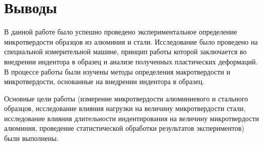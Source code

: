 \documentclass[12pt, a4paper]{article}
\begin{document}
    \newpage
    
    \section{Выводы}
    
    В данной работе было успешно проведено экспериментальное определение микротвердости образцов из алюминия и стали. Исследование было проведено на специальной измерительной машине, принцип работы которой заключается во внедрении индентора в образец и анализе полученных пластических деформаций. В процессе работы были изучены методы определения макротвердости и микротвердости, основанные на внедрении индентора в образец.
    
    Основные цели работы (измерение микротвердости алюминиевого и стального образцов, исследование влияния нагрузки на величину микротвердости стали, исследование влияния длительности индентирования на величину микротвердости алюминия, проведение статистической обработки результатов экспериментов) были выполнены.
    
\end{document}

